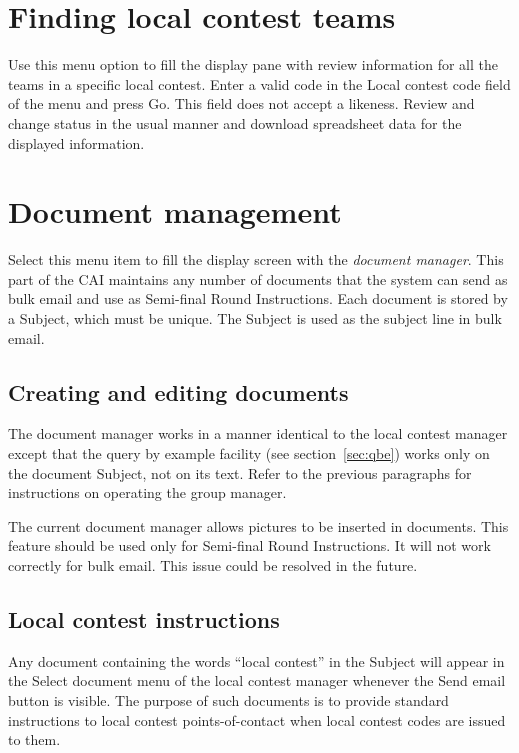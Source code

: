 \documentclass[11pt,letterpaper]{refart}
\def\ui#1{\textsf{#1}}
\begin{document}
\section{Finding local contest teams}
Use this menu option to fill the display pane with review information for all the
teams in a specific local contest. 
Enter a valid code in the \ui{Local contest code} field of the menu
and press \ui{Go}. This field does not accept a likeness.
Review and change status in the usual 
manner and download spreadsheet data for the displayed information.

\section{Document management}
\label{sec:documentmanagement}
Select this menu item to fill the display screen with the \emph{document 
manager}. This part of the CAI maintains any number of documents that 
the system can send as bulk email and use as Semi-final Round Instructions.
Each document is stored by a Subject, which must be unique. The Subject
is used as the subject line in bulk email.

\subsection{Creating and editing documents}
The document manager works in a manner identical to the local contest
manager except that the query by example facility (see section~\ref{sec:qbe})
works only on the document Subject, not on its text. Refer to the previous
paragraphs for instructions on operating the group manager.

The current document manager allows pictures to be inserted in documents.
This feature should be used only for Semi-final Round Instructions. It will
not work correctly for bulk email. This issue could be resolved in the future.

\subsection{Local contest instructions}
Any document containing the words ``local contest'' in the Subject will appear
in the \ui{Select document} menu of the local contest manager whenever 
the \ui{Send email} button is visible. The purpose of such documents is to
provide standard instructions to local contest points-of-contact when local
contest codes are issued to them. 
\end{document}
